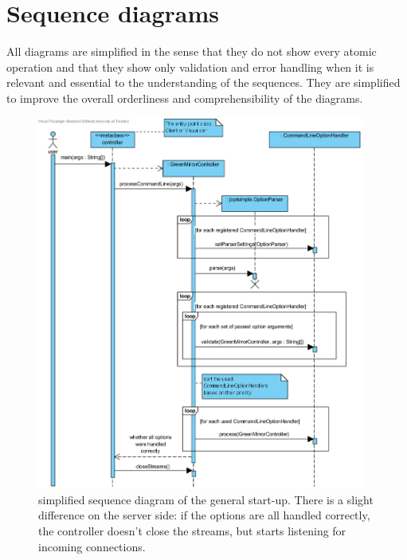\section{Sequence diagrams}\label{app:seq}
All diagrams are simplified in the sense that they do not show every atomic operation and that they show only validation and error handling when it is relevant and essential to the understanding of the sequences. They are simplified to improve the overall orderliness and comprehensibility of the diagrams.
\begin{figure}[hb]
  \centering
  \includegraphics[width=0.96\textwidth]{diagrams/SD_generalstartup}
  \caption{simplified sequence diagram of the general start-up. There is a slight difference on the server side: if the options are all handled correctly, the controller doesn't close the streams, but starts listening for incoming connections.}\label{fig:sd_generalstartup}
\end{figure}

